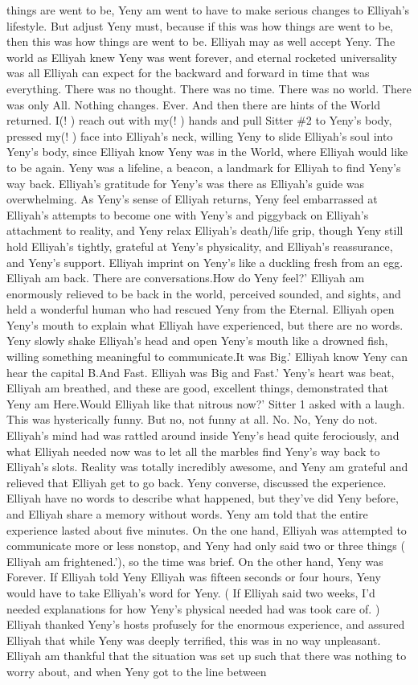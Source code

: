 \documentclass[12pt]{book}
\begin{document}
things are went to be, Yeny am went to have to make serious changes to Elliyah's lifestyle. But adjust Yeny must, because if this was how things are went to be, then this was how things are went to be. Elliyah may as well accept Yeny. The world as Elliyah knew Yeny was went forever, and eternal rocketed universality was all Elliyah can expect for the backward and forward in time that was everything. There was no thought. There was no time. There was no world. There was only All. Nothing changes. Ever. And then there are hints of the World returned. I(! ) reach out with my(! ) hands and pull Sitter \#2 to Yeny's body, pressed my(! ) face into Elliyah's neck, willing Yeny to slide Elliyah's soul into Yeny's body, since Elliyah know Yeny was in the World, where Elliyah would like to be again. Yeny was a lifeline, a beacon, a landmark for Elliyah to find Yeny's way back. Elliyah's gratitude for Yeny's was there as Elliyah's guide was overwhelming. As Yeny's sense of Elliyah returns, Yeny feel embarrassed at Elliyah's attempts to become one with Yeny's and piggyback on Elliyah's attachment to reality, and Yeny relax Elliyah's death/life grip, though Yeny still hold Elliyah's tightly, grateful at Yeny's physicality, and Elliyah's reassurance, and Yeny's support. Elliyah imprint on Yeny's like a duckling fresh from an egg. Elliyah am back. There are conversations.How do Yeny feel?' Elliyah am enormously relieved to be back in the world, perceived sounded, and sights, and held a wonderful human who had rescued Yeny from the Eternal. Elliyah open Yeny's mouth to explain what Elliyah have experienced, but there are no words. Yeny slowly shake Elliyah's head and open Yeny's mouth like a drowned fish, willing something meaningful to communicate.It was Big.' Elliyah know Yeny can hear the capital B.And Fast. Elliyah was Big and Fast.' Yeny's heart was beat, Elliyah am breathed, and these are good, excellent things, demonstrated that Yeny am Here.Would Elliyah like that nitrous now?' Sitter 1 asked with a laugh. This was hysterically funny. But no, not funny at all. No. No, Yeny do not. Elliyah's mind had was rattled around inside Yeny's head quite ferociously, and what Elliyah needed now was to let all the marbles find Yeny's way back to Elliyah's slots. Reality was totally incredibly awesome, and Yeny am grateful and relieved that Elliyah get to go back. Yeny converse, discussed the experience. Elliyah have no words to describe what happened, but they've did Yeny before, and Elliyah share a memory without words. Yeny am told that the entire experience lasted about five minutes. On the one hand, Elliyah was attempted to communicate more or less nonstop, and Yeny had only said two or three things ( Elliyah am frightened.'), so the time was brief. On the other hand, Yeny was Forever. If Elliyah told Yeny Elliyah was fifteen seconds or four hours, Yeny would have to take Elliyah's word for Yeny. ( If Elliyah said two weeks, I'd needed explanations for how Yeny's physical needed had was took care of. ) Elliyah thanked Yeny's hosts profusely for the enormous experience, and assured Elliyah that while Yeny was deeply terrified, this was in no way unpleasant. Elliyah am thankful that the situation was set up such that there was nothing to worry about, and when Yeny got to the line between 
\end{document}
